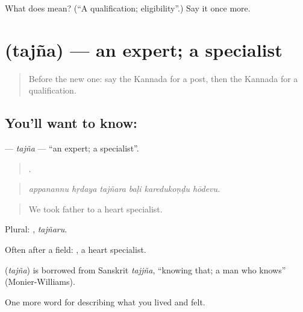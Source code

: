 \begin{tcolorbox}[breakable,colback=teal!4,colframe=teal!35!black,title={Before you move on}]
What does  mean? (\textquotedblleft{}A qualification; eligibility\textquotedblright{}.) Say it once more.
\end{tcolorbox}
\section[\texorpdfstring{\kn{ತಜ್ಞ} (tajña)}{ತಜ್ಞ (tajña)}]{ (tajña) — an expert; a specialist}

\label{lesson:KA-C516-tajna}



\begin{quote}
Before the new one: say the Kannada for a post, then the Kannada for a qualification.
\end{quote}

\subsection*{You'll want to know: }
\textbf{} — \emph{tajña} — \textquotedblleft{}an expert; a specialist\textquotedblright{}.

\begin{quote}
     .
\end{quote}

\begin{quote}
\emph{appanannu hṛdaya tajñara baḷi karedukoṇḍu hōdevu.}
\end{quote}

\begin{quote}
We took father to a heart specialist.
\end{quote}

Plural: , \emph{tajñaru}.

Often after a field:  , a heart specialist.

\begin{cousinweb}
\textbf{} (\emph{tajña}) is borrowed from Sanskrit \emph{tajjña}, \textquotedblleft{}knowing that; a man who knows\textquotedblright{} (Monier-Williams).
\end{cousinweb}

\begin{grammarlens}[title={What you've built}]
One more word for describing what you lived and felt.
\end{grammarlens}

